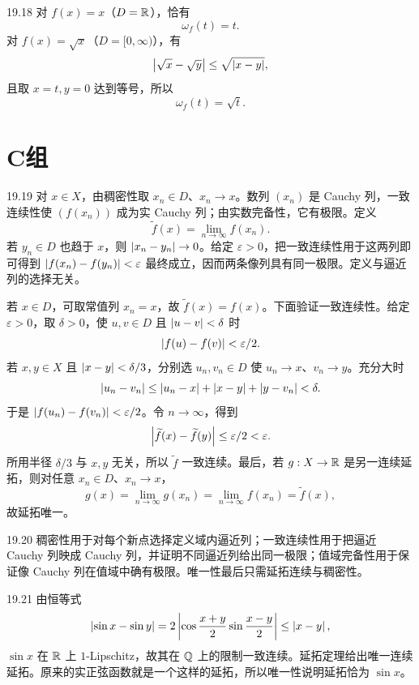 \begin{solution}{19.18}
对 \(f(x)=x\)（\(D=\mathbb{R}\)），恰有
\[
 \omega_f(t)=t.
\]
对 \(f(x)=\sqrt x\)（\(D=[0,\infty)\)），有
\[
 \left|\sqrt x-\sqrt y\right|\le\sqrt{\left|x-y\right|},
\]
且取 \(x=t,y=0\) 达到等号，所以
\[
 \omega_f(t)=\sqrt t.
\]
\end{solution}

\section*{C组}

\begin{solution}{19.19}
对 \(x\in X\)，由稠密性取 \(x_n\in D\)、\(x_n\to x\)。数列 \((x_n)\) 是 Cauchy 列，一致连续性使 \((f(x_n))\) 成为实 Cauchy 列；由实数完备性，它有极限。定义
\[
 \widetilde f(x)=\lim_{n\to\infty}f(x_n).
\]
若 \(y_n\in D\) 也趋于 \(x\)，则 \(\left|x_n-y_n\right|\to0\)。给定 \(\varepsilon>0\)，把一致连续性用于这两列即可得到 \(\left|f(x_n)-f(y_n)\right|<\varepsilon\) 最终成立，因而两条像列具有同一极限。定义与逼近列的选择无关。

若 \(x\in D\)，可取常值列 \(x_n=x\)，故 \(\widetilde f(x)=f(x)\)。下面验证一致连续性。给定 \(\varepsilon>0\)，取 \(\delta>0\)，使 \(u,v\in D\) 且 \(\left|u-v\right|<\delta\) 时
\[
 \left|f(u)-f(v)\right|<\varepsilon/2.
\]
若 \(x,y\in X\) 且 \(\left|x-y\right|<\delta/3\)，分别选 \(u_n,v_n\in D\) 使 \(u_n\to x\)、\(v_n\to y\)。充分大时
\[
 \left|u_n-v_n\right|
 \le \left|u_n-x\right|+\left|x-y\right|+\left|y-v_n\right|<\delta.
\]
于是 \(\left|f(u_n)-f(v_n)\right|<\varepsilon/2\)。令 \(n\to\infty\)，得到
\[
 \left|\widetilde f(x)-\widetilde f(y)\right|
 \le\varepsilon/2<\varepsilon.
\]
所用半径 \(\delta/3\) 与 \(x,y\) 无关，所以 \(\widetilde f\) 一致连续。最后，若 \(g:X\to\mathbb{R}\) 是另一连续延拓，则对任意 \(x_n\in D\)、\(x_n\to x\)，
\[
 g(x)=\lim_{n\to\infty}g(x_n)
     =\lim_{n\to\infty}f(x_n)
     =\widetilde f(x),
\]
故延拓唯一。
\end{solution}

\begin{solution}{19.20}
稠密性用于对每个新点选择定义域内逼近列；一致连续性用于把逼近 Cauchy 列映成 Cauchy 列，并证明不同逼近列给出同一极限；值域完备性用于保证像 Cauchy 列在值域中确有极限。唯一性最后只需延拓连续与稠密性。
\end{solution}

\begin{solution}{19.21}
由恒等式
\[
 \left|\sin x-\sin y\right|
 =2\left|\cos\frac{x+y}{2}\sin\frac{x-y}{2}\right|
 \le\left|x-y\right|,
\]
\(\sin x\) 在 \(\mathbb{R}\) 上 \(1\)-Lipschitz，故其在 \(\mathbb{Q}\) 上的限制一致连续。延拓定理给出唯一连续延拓。原来的实正弦函数就是一个这样的延拓，所以唯一性说明延拓恰为 \(\sin x\)。
\end{solution}

